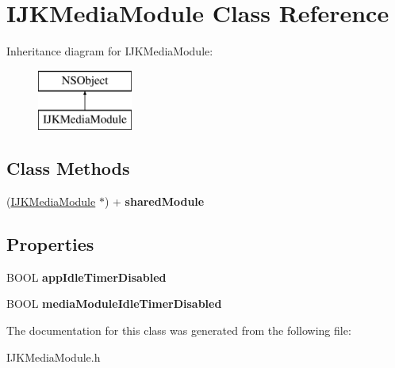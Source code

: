 \hypertarget{interface_i_j_k_media_module}{}\section{I\+J\+K\+Media\+Module Class Reference}
\label{interface_i_j_k_media_module}
Inheritance diagram for I\+J\+K\+Media\+Module\+:\begin{figure}[H]
\begin{center}
\leavevmode
\includegraphics[height=2.000000cm]{interface_i_j_k_media_module}
\end{center}
\end{figure}
\subsection*{Class Methods}
\begin{DoxyCompactItemize}
\item 
\mbox{\label{interface_i_j_k_media_module_a0c749d2c2a13bfeb408502f9d18a5cca}} 
(\hyperlink{interface_i_j_k_media_module}{I\+J\+K\+Media\+Module} $\ast$) + {\bfseries shared\+Module}
\end{DoxyCompactItemize}
\subsection*{Properties}
\begin{DoxyCompactItemize}
\item 
\mbox{\label{interface_i_j_k_media_module_ad080b2121247de7d6fe706053f7f25df}} 
B\+O\+OL {\bfseries app\+Idle\+Timer\+Disabled}
\item 
\mbox{\label{interface_i_j_k_media_module_a2bbe08dfd29afee83d8b232f286f27e1}} 
B\+O\+OL {\bfseries media\+Module\+Idle\+Timer\+Disabled}
\end{DoxyCompactItemize}


The documentation for this class was generated from the following file\+:\begin{DoxyCompactItemize}
\item 
I\+J\+K\+Media\+Module.\+h\end{DoxyCompactItemize}
